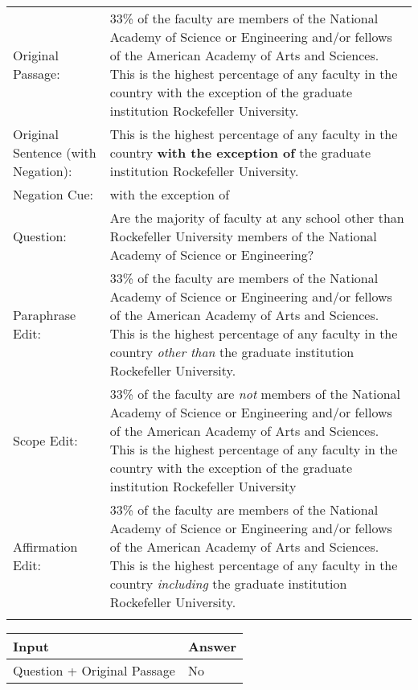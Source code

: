 \begin{figure*}
    \small
      \begin{tabularx}{\textwidth}{p{.9in}X} 
        \toprule
        {Original Passage:} & 33\% of the faculty are members of the National Academy of Science or Engineering and/or fellows of the American Academy of Arts and Sciences. This is the highest percentage of any faculty in the country with the exception of the graduate institution Rockefeller University. \\ \addlinespace
        {Original Sentence (with Negation):} & This is the highest percentage of any faculty in the country \textbf{with the exception of} the graduate institution Rockefeller University. \\ \addlinespace
        {Negation Cue:} & with the exception of \\ \addlinespace
        {Question:} & Are the majority of faculty at any school other than Rockefeller University members of the National Academy of Science or Engineering? \\ \addlinespace
        \midrule
        Paraphrase Edit: &  33\% of the faculty are members of the National Academy of Science or Engineering and/or fellows of the American Academy of Arts and Sciences. This is the highest percentage of any faculty in the country \emph{other than} the graduate institution Rockefeller University. \\ \addlinespace
        \midrule
        Scope Edit: &  33\% of the faculty are \emph{not} members of the National Academy of Science or Engineering and/or fellows of the American Academy of Arts and Sciences. This is the highest percentage of any faculty in the country with the exception of the graduate institution Rockefeller University \\ \addlinespace
        \midrule
        Affirmation Edit: &  33\% of the faculty are members of the National Academy of Science or Engineering and/or fellows of the American Academy of Arts and Sciences. This is the highest percentage of any faculty in the country \emph{including} the graduate institution Rockefeller University. \\ \addlinespace
        \midrule
      \end{tabularx}
      \begin{tabularx}{\textwidth}{l@{\hspace{0.28 \textwidth}}l}
        \midrule
            Input & Answer \\
        \midrule
            Question + Original Passage & No \\

\end{tabularx}
\end{figure*}
